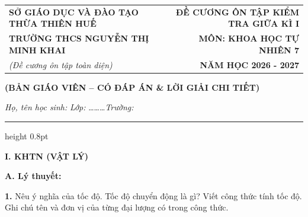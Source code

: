\documentclass[11pt,a4paper]{article}
\begin{document}
\begin{tabularx}{\textwidth}{@{}l X r@{}}
\textbf{\small SỞ GIÁO DỤC VÀ ĐÀO TẠO THỪA THIÊN HUẾ} & & \textbf{\small ĐỀ CƯƠNG ÔN TẬP KIỂM TRA GIỮA KÌ I} \\
\textbf{\normalsize TRƯỜNG THCS NGUYỄN THỊ MINH KHAI} & & \textbf{\normalsize MÔN: KHOA HỌC TỰ NHIÊN 7} \\
\textit{\small (Đề cương ôn tập toàn diện)} & & \textbf{\small NĂM HỌC 2026 - 2027}
\end{tabularx}

\begin{center}
{\color{red!80!black}\textbf{(BẢN GIÁO VIÊN -- CÓ ĐÁP ÁN \& LỜI GIẢI CHI TIẾT)}}\par\vspace{3pt}
\textit{Họ, tên học sinh:} \dotfill \quad \textit{Lớp:} \dots\dots\dots \quad \textit{Trường:} \dotfill
\end{center}
\vspace{-4pt}
{\color{gray!50}\hrule height 0.8pt}
\vspace{8pt}

{\color{myGreen}\large\bfseries I. KHTN (VẬT LÝ)}

\vspace{3pt}
{\color{mySub}\textbf{A. Lý thuyết:}}

\textbf{1.} Nêu ý nghĩa của tốc độ. Tốc độ chuyển động là gì? Viết công thức tính tốc độ. Ghi chú tên và đơn vị của từng đại lượng có trong công thức.
\end{document}
